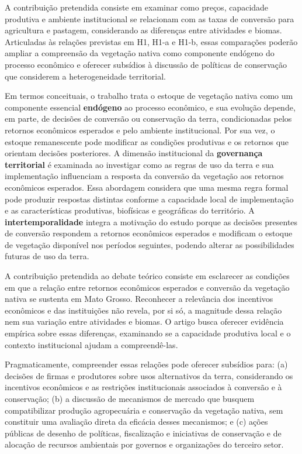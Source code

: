 A contribuição pretendida consiste em examinar como preços, capacidade produtiva e ambiente institucional se relacionam com as taxas de conversão para agricultura e pastagem, considerando as diferenças entre atividades e biomas. Articuladas às relações previstas em H1, H1-a e H1-b, essas comparações poderão ampliar a compreensão da vegetação nativa como componente endógeno do processo econômico e oferecer subsídios à discussão de políticas de conservação que considerem a heterogeneidade territorial.

Em termos conceituais, o trabalho trata o estoque de vegetação nativa como um componente essencial \textbf{endógeno} ao processo econômico, e sua evolução depende, em parte, de decisões de conversão ou conservação da terra, condicionadas pelos retornos econômicos esperados e pelo ambiente institucional. Por sua vez, o estoque remanescente pode modificar as condições produtivas e os retornos que orientam decisões posteriores. A dimensão institucional da \textbf{governança territorial} é examinada ao investigar como as regras de uso da terra e sua implementação influenciam a resposta da conversão da vegetação aos retornos econômicos esperados. Essa abordagem considera que uma mesma regra formal pode produzir respostas distintas conforme a capacidade local de implementação e as características produtivas, biofísicas e geográficas do território. A \textbf{intertemporalidade} integra a motivação do estudo porque as decisões presentes de conversão respondem a retornos econômicos esperados e modificam o estoque de vegetação disponível nos períodos seguintes, podendo alterar as possibilidades futuras de uso da terra. 

A contribuição pretendida ao debate teórico consiste em esclarecer as condições em que a relação entre retornos econômicos esperados e conversão da vegetação nativa se sustenta em Mato Grosso. Reconhecer a relevância dos incentivos econômicos e das instituições não revela, por si só, a magnitude dessa relação nem sua variação entre atividades e biomas. O artigo busca oferecer evidência empírica sobre essas diferenças, examinando se a capacidade produtiva local e o contexto institucional ajudam a compreendê-las.

Pragmaticamente, compreender essas relações pode oferecer subsídios para: (a) decisões de firmas e produtores sobre usos alternativos da terra, considerando os incentivos econômicos e as restrições institucionais associados à conversão e à conservação; (b) a discussão de mecanismos de mercado que busquem compatibilizar produção agropecuária e conservação da vegetação nativa, sem constituir uma avaliação direta da eficácia desses mecanismos; e (c) ações públicas de desenho de políticas, fiscalização e iniciativas de conservação e de alocação de recursos ambientais por governos e organizações do terceiro setor.

